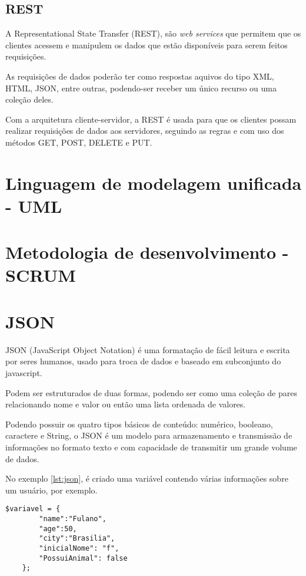 \subsection{REST}
A Representational State Transfer (REST), são \textit{web services} que permitem que os clientes acessem e manipulem os dados que estão disponíveis para serem feitos requisições. 

As requisições de dados poderão ter como respostas aquivos do tipo XML, HTML, JSON, entre outras, podendo-ser receber um único recurso ou 
uma coleção deles.

Com a arquitetura cliente-servidor, a REST é usada para que os clientes possam realizar requisições de dados aos servidores, seguindo as regras e com uso dos métodos GET, POST, DELETE e PUT.  

\section{Linguagem de modelagem unificada - UML}

\section{Metodologia de desenvolvimento - SCRUM}

\section{JSON}
JSON (JavaScript Object Notation) é uma formatação de fácil leitura e escrita por seres humanos, usado para troca de dados e baseado em subconjunto do javascript.

Podem ser estruturados de duas formas, podendo ser como uma coleção de pares relacionando nome e valor ou então uma lista ordenada de valores. 

Podendo possuir os quatro tipos básicos de conteúdo: numérico, booleano, caractere e String, o JSON é um modelo para armazenamento e transmissão de informações no formato texto e com capacidade de transmitir um grande volume de dados.

No exemplo \ref{lst:json}, é criado uma variável contendo várias informações sobre um usuário, por exemplo. 

\begin{lstlisting}[caption={Exemplo de JSON},label={lst:json}]
	$variavel = { 
		"name":"Fulano", 
		"age":50, 
		"city":"Brasilia",
		"inicialNome": "f",
		"PossuiAnimal": false
	};
\end{lstlisting}

